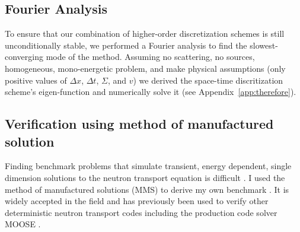 \subsection{Fourier Analysis}

To ensure that our combination of higher-order discretization schemes is still unconditionally stable, we performed a Fourier analysis to find the slowest-converging mode of the method.
Assuming no scattering, no sources, homogeneous, mono-energetic problem, and make physical assumptions (only positive values of $\Delta x$, $\Delta t$, $\Sigma$, and $v$) we derived the space-time discritization scheme's eigen-function and numerically solve it (see Appendix~\ref{app:therefore}).

\subsection{Verification using method of manufactured solution}

Finding benchmark problems that simulate transient, energy dependent, single dimension solutions to the neutron transport equation is difficult \cite{roy_review_2005}.
I used the method of manufactured solutions (MMS) to derive my own benchmark \cite{nse_mms_warsaw}.
It is widely accepted in the field and has previously been used to verify other deterministic neutron transport codes including the production code solver MOOSE \citep{wang_application_2018,moosemms}.

